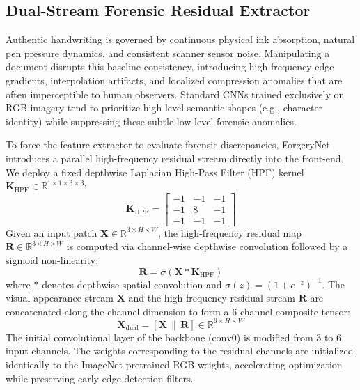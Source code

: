 \documentclass[pdflatex,sn-mathphys-num,iicol]{sn-jnl}
\begin{document}
\subsection{Dual-Stream Forensic Residual Extractor}\label{subsec4_1}
Authentic handwriting is governed by continuous physical ink absorption, natural pen pressure dynamics, and consistent scanner sensor noise. Manipulating a document disrupts this baseline consistency, introducing high-frequency edge gradients, interpolation artifacts, and localized compression anomalies that are often imperceptible to human observers. Standard CNNs trained exclusively on RGB imagery tend to prioritize high-level semantic shapes (e.g., character identity) while suppressing these subtle low-level forensic anomalies.

To force the feature extractor to evaluate forensic discrepancies, ForgeryNet introduces a parallel high-frequency residual stream directly into the front-end. We deploy a fixed depthwise Laplacian High-Pass Filter (HPF) kernel $\mathbf{K}_{\text{HPF}} \in \mathbb{R}^{1 \times 1 \times 3 \times 3}$:
\begin{equation}
\mathbf{K}_{\text{HPF}} = \begin{bmatrix} -1 & -1 & -1 \\ -1 & 8 & -1 \\ -1 & -1 & -1 \end{bmatrix}\label{eq_hpf}
\end{equation}
Given an input patch $\mathbf{X} \in \mathbb{R}^{3 \times H \times W}$, the high-frequency residual map $\mathbf{R} \in \mathbb{R}^{3 \times H \times W}$ is computed via channel-wise depthwise convolution followed by a sigmoid non-linearity:
\begin{equation}
\mathbf{R} = \sigma\left(\mathbf{X} * \mathbf{K}_{\text{HPF}}\right)\label{eq_residual}
\end{equation}
where $*$ denotes depthwise spatial convolution and $\sigma(z) = (1 + e^{-z})^{-1}$. The visual appearance stream $\mathbf{X}$ and the high-frequency residual stream $\mathbf{R}$ are concatenated along the channel dimension to form a 6-channel composite tensor:
\begin{equation}
\mathbf{X}_{\text{dual}} = [\mathbf{X} \,\|\, \mathbf{R}] \in \mathbb{R}^{6 \times H \times W}\label{eq_concat}
\end{equation}
The initial convolutional layer of the backbone ($\text{conv0}$) is modified from 3 to 6 input channels. The weights corresponding to the residual channels are initialized identically to the ImageNet-pretrained RGB weights, accelerating optimization while preserving early edge-detection filters.
\end{document}
